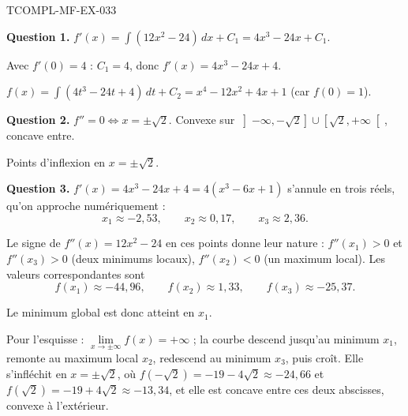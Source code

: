 \begin{corrige}{TCOMPL-MF-EX-033}

\textbf{Question 1.} $f'(x) = \int (12x^2 - 24)\,dx + C_1 = 4x^3 - 24x + C_1$.

Avec $f'(0) = 4$ : $C_1 = 4$, donc $f'(x) = 4x^3 - 24x + 4$.


$f(x) = \int (4t^3 - 24t + 4)\,dt + C_2 = x^4 - 12x^2 + 4x + 1$ (car $f(0) = 1$).

\textbf{Question 2.} $f'' = 0 \iff x = \pm\sqrt{2}$. Convexe sur $\left]-\infty,-\sqrt2\right] \cup \left[\sqrt2,+\infty\right[$, concave entre.

Points d'inflexion en $x = \pm\sqrt{2}$.

\textbf{Question 3.} $f'(x) = 4x^3 - 24x + 4 = 4(x^3 - 6x + 1)$ s'annule en trois
réels, qu'on approche numériquement :
\[ x_1 \approx -2{,}53, \qquad x_2 \approx 0{,}17, \qquad x_3 \approx 2{,}36. \]

Le signe de $f''(x) = 12x^2 - 24$ en ces points donne leur nature :
$f''(x_1) > 0$ et $f''(x_3) > 0$ (deux minimums locaux), $f''(x_2) < 0$ (un
maximum local). Les valeurs correspondantes sont
\[ f(x_1) \approx -44{,}96, \qquad f(x_2) \approx 1{,}33, \qquad f(x_3) \approx -25{,}37. \]

Le minimum global est donc atteint en $x_1$.

Pour l'esquisse : $\lim\limits_{x\to\pm\infty} f(x) = +\infty$ ; la courbe descend
jusqu'au minimum $x_1$, remonte au maximum local $x_2$, redescend au minimum
$x_3$, puis croît. Elle s'infléchit en $x=\pm\sqrt2$, où
$f(-\sqrt2) = -19-4\sqrt2 \approx -24{,}66$ et $f(\sqrt2) = -19+4\sqrt2 \approx -13{,}34$,
et elle est concave entre ces deux abscisses, convexe à l'extérieur.

\end{corrige}
